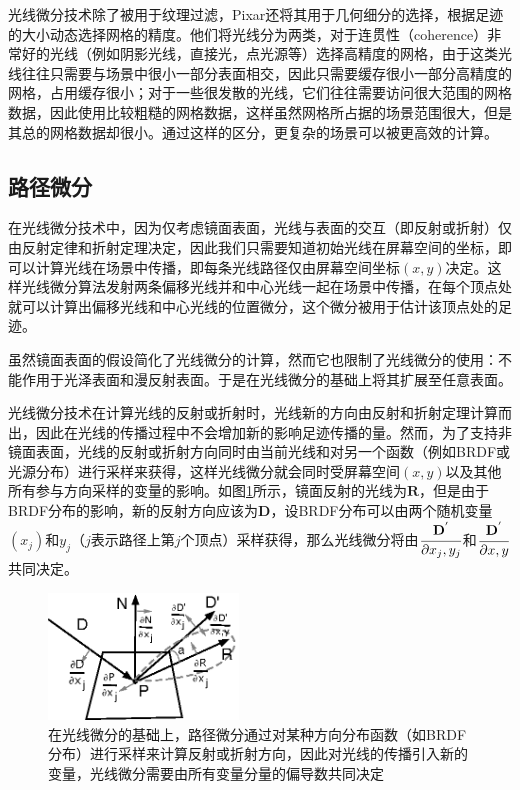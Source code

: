光线微分技术除了被用于纹理过滤，Pixar\cite{a:RayDifferentialsandMultiresolutionGeometryCachingforDistributionRayTracinginComplexScenes,a:RayTracingfortheMovieCars}还将其用于几何细分的选择，根据足迹的大小动态选择网格的精度。他们将光线分为两类，对于连贯性（coherence）非常好的光线（例如阴影光线，直接光，点光源等）选择高精度的网格，由于这类光线往往只需要与场景中很小一部分表面相交，因此只需要缓存很小一部分高精度的网格，占用缓存很小；对于一些很发散的光线，它们往往需要访问很大范围的网格数据，因此使用比较粗糙的网格数据，这样虽然网格所占据的场景范围很大，但是其总的网格数据却很小。通过这样的区分，更复杂的场景可以被更高效的计算。








\subsection{路径微分}\label{sec:pt-path-differentials}
在光线微分技术中，因为仅考虑镜面表面，光线与表面的交互（即反射或折射）仅由反射定律和折射定理决定，因此我们只需要知道初始光线在屏幕空间的坐标，即可以计算光线在场景中传播，即每条光线路径仅由屏幕空间坐标$(x,y)$决定。这样光线微分算法发射两条偏移光线并和中心光线一起在场景中传播，在每个顶点处就可以计算出偏移光线和中心光线的位置微分，这个微分被用于估计该顶点处的足迹。

虽然镜面表面的假设简化了光线微分的计算，然而它也限制了光线微分的使用：不能作用于光泽表面和漫反射表面。于是\cite{a:Pathdifferentialsandapplications}在光线微分的基础上将其扩展至任意表面。

光线微分技术在计算光线的反射或折射时，光线新的方向由反射和折射定理计算而出，因此在光线的传播过程中不会增加新的影响足迹传播的量。然而，为了支持非镜面表面，光线的反射或折射方向同时由当前光线和对另一个函数（例如BRDF或光源分布）进行采样来获得，这样光线微分就会同时受屏幕空间$(x,y)$以及其他所有参与方向采样的变量的影响。如图\ref{f:pt-path-differentials}所示，镜面反射的光线为$\mathbf{R}$，但是由于BRDF分布的影响，新的反射方向应该为$\mathbf{D}$，设BRDF分布可以由两个随机变量$(x_j)$和$y_j$（$j$表示路径上第$j$个顶点）采样获得，那么光线微分将由$ \cfrac{\mathbf{D}^{'}}{{\rm \partial} x_j,y_j}$和$ \cfrac{\mathbf{D}^{'}}{{\rm \partial} x,y}$共同决定。

\begin{figure}
	\sidecaption
	\includegraphics[width=0.45\textwidth]{figures/pt/path-differentials}
	\caption{在光线微分的基础上，路径微分通过对某种方向分布函数（如BRDF分布）进行采样来计算反射或折射方向，因此对光线的传播引入新的变量，光线微分需要由所有变量分量的偏导数共同决定}
	\label{f:pt-path-differentials}
\end{figure}


